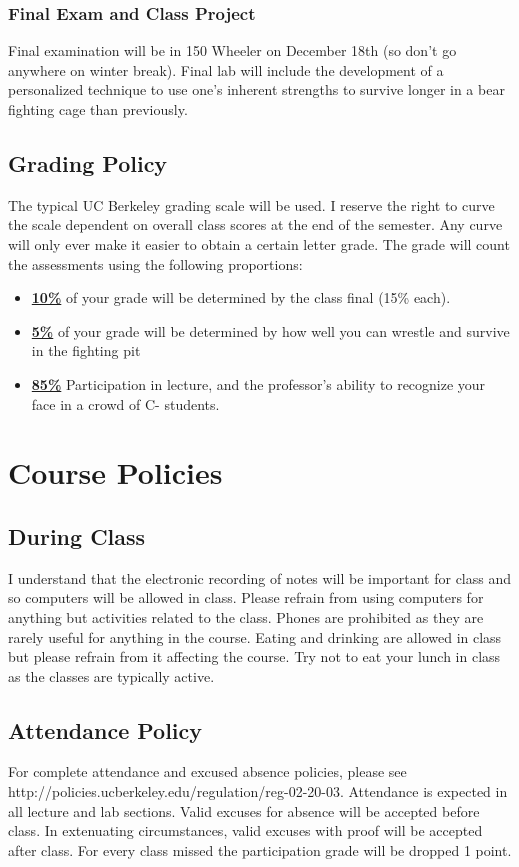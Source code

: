 \documentclass[11pt]{article}
\begin{document}
\subsubsection*{Final Exam and Class Project}

Final examination will be in 150 Wheeler on December 18th (so don't go anywhere on winter break). Final lab will include the development of a personalized technique to use one's inherent strengths to survive longer in a bear fighting cage than previously. 

\subsection*{Grading Policy}
The typical UC Berkeley grading scale will be used. I reserve the right to curve the scale dependent on overall class scores at the end of the semester. Any curve will only ever make it easier to obtain a certain letter grade. The grade will count the assessments using the following proportions:
\begin{itemize}
	\item \underline{\textbf{10\%}} of your grade will be determined by the class final (15\% each).
	\item \underline{\textbf{5\%}} of your grade will be determined by how well you can wrestle and survive in the fighting pit
	\item \underline{\textbf{85\%}} Participation in lecture, and the professor's ability to recognize your face in a crowd of C- students. 
\end{itemize}

\section*{Course Policies}

\subsection*{During Class}
\footnotesize{I understand that the electronic recording of notes will be important for class and so computers will be allowed in class. Please refrain from using computers for anything but activities related to the class. Phones are prohibited as they are rarely useful for anything in the course. Eating and drinking are allowed in class but please refrain from it affecting the course. Try not to eat your lunch in class as the classes are typically active.}

\subsection*{Attendance Policy}
\footnotesize{For complete attendance and excused absence policies, please see http://policies.ucberkeley.edu/regulation/reg-02-20-03. Attendance is expected in all lecture and lab sections. Valid excuses for absence will be accepted before class. In extenuating circumstances, valid excuses with proof will be accepted after class. For every class missed the participation grade will be dropped 1 point.}
\end{document}
